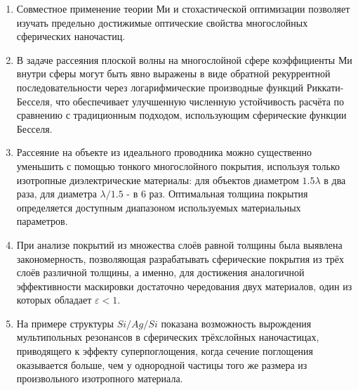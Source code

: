 {}  %
\mynobreakpar\begin{enumerate}
  \item Совместное применение теории Ми и стохастической оптимизации
    позволяет изучать предельно достижимые оптические свойства многослойных
    сферических наночастиц. %
  \item В задаче рассеяния плоской волны на многослойной сфере
    коэффициенты Ми внутри сферы могут быть явно выражены в виде
    обратной рекуррентной последовательности через логарифмические
    производные функций Риккати-Бесселя, что обеспечивает улучшенную
    численную устойчивость расчёта по сравнению с традиционным
    подходом, использующим сферические функции Бесселя. %
  \item Рассеяние на объекте из идеального проводника можно
    существенно уменьшить с помощью тонкого многослойного покрытия,
    используя только изотропные диэлектрические материалы: для
    объектов диаметром $1.5\lambda$ в два раза, для диаметра
    $\lambda/1.5$ - в 6 раз. Оптимальная толщина покрытия определяется
    доступным диапазоном используемых материальных параметров.
  \item 
    При анализе покрытий из множества слоёв равной толщины
    была выявлена закономерность, позволяющая разрабатывать
    сферические покрытия из трёх слоёв различной толщины, а именно,
    для достижения аналогичной эффективности маскировки достаточно
    чередования двух материалов, один из которых обладает
    $\varepsilon<1$. 

  \item На примере структуры $Si/Ag/Si$ показана возможность
    вырождения мультипольных резонансов в сферических трёхслойных
    наночастицах, приводящего к эффекту суперпоглощения, когда сечение
    поглощения оказывается больше, чем у однородной частицы того же
    размера из произвольного изотропного материала.
\end{enumerate}


